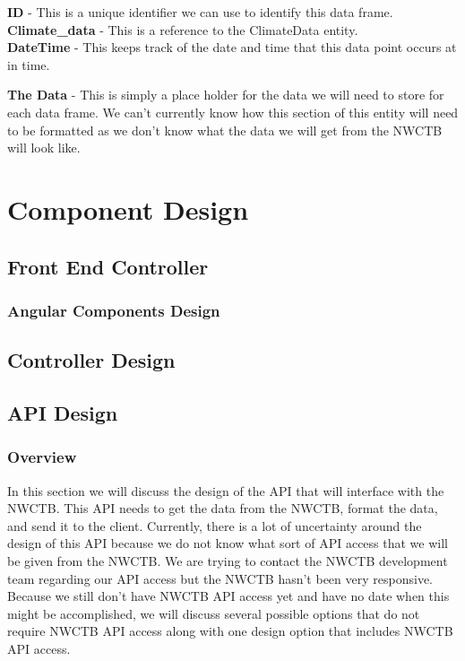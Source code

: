 \documentclass[onecolumn, draftclsnofoot,10pt, compsoc]{article}
\begin{document}
					\textbf{ID} - This is a unique identifier we can use to identify this data frame.\\
					
					\textbf{Climate\_data} - This is a reference to the ClimateData entity.\\
					
					\textbf{DateTime} - This keeps track of the date and time that this data point occurs at in time.
					
					\textbf{The Data} - This is simply a place holder for the data we will need to store for each data frame. We can't currently know how this section of this entity will need to be formatted as we don't know what the data we will get from the NWCTB will look like.\\
				
				
		
		
		
\section{Component Design}

	\subsection{Front End Controller}
	
		\subsubsection{Angular Components Design}
	

	\subsection{Controller Design}
	
	\subsection{API Design}
		\subsubsection{Overview}
			In this section we will discuss the design of the API that will interface with the NWCTB. This API needs to get the data from the NWCTB, format the data, and send it to the client. Currently, there is a lot of uncertainty around the design of this API because we do not know what sort of API access that we will be given from the NWCTB. We are trying to contact the NWCTB development team regarding our API access but the NWCTB hasn't been very responsive. Because we still don't have NWCTB API access yet and have no date when this might be accomplished, we will discuss several possible options that do not require NWCTB API access along with one design option that includes NWCTB API access.
			
\end{document}
